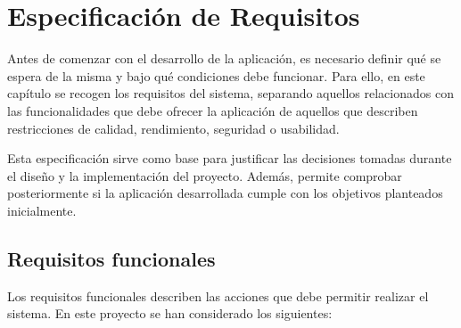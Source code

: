 \chapter{Especificación de Requisitos}
\label{cap:requisitos}

Antes de comenzar con el desarrollo de la aplicación, es necesario definir qué se espera de la misma y bajo qué condiciones debe funcionar. Para ello, en este capítulo se recogen los requisitos del sistema, separando aquellos relacionados con las funcionalidades que debe ofrecer la aplicación de aquellos que describen restricciones de calidad, rendimiento, seguridad o usabilidad.

Esta especificación sirve como base para justificar las decisiones tomadas durante el diseño y la implementación del proyecto. Además, permite comprobar posteriormente si la aplicación desarrollada cumple con los objetivos planteados inicialmente.

\section{Requisitos funcionales}

Los requisitos funcionales describen las acciones que debe permitir realizar el sistema. En este proyecto se han considerado los siguientes:

